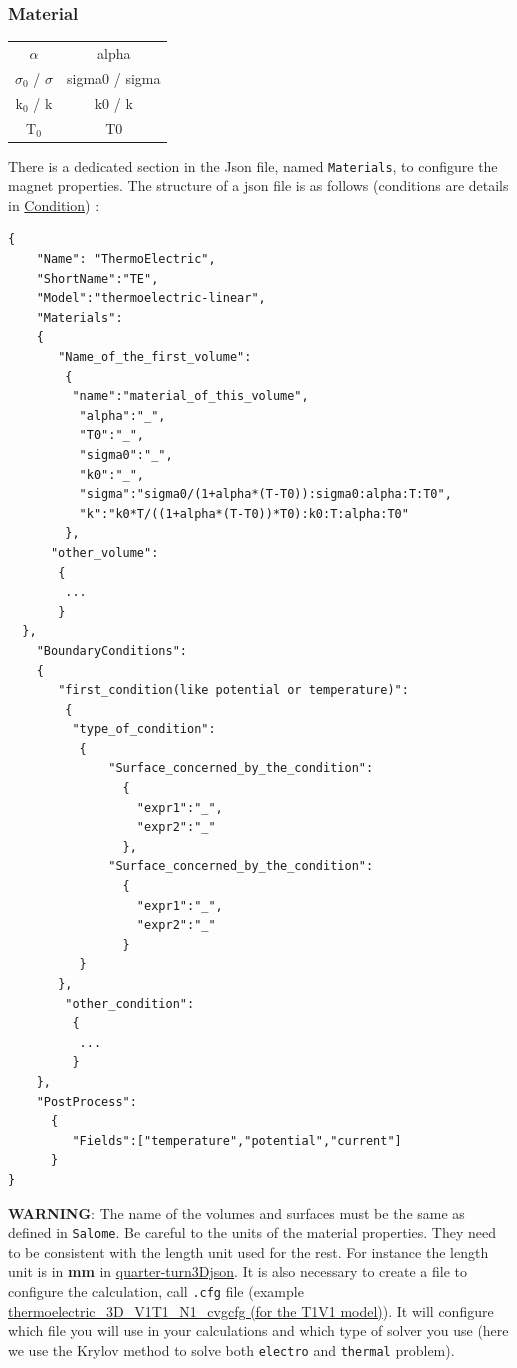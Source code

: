 \documentclass[11pt]{amsart}
\newcommand{\admonition}[2]{\textbf{#1}: {#2}}
\begin{document}
\hypertarget{x-material}{\subsubsection{Material}}
\begin{center}
\begin{tabular}{|c|c|}
\hline
$\alpha$ & alpha \\ 
$\sigma_{0}$ / $\sigma$ & sigma0 / sigma \\ 
k${}_{0}$ / k & k0 / k \\ 
T${}_{0}$ & T0 \\ 
\hline
\end{tabular}
\end{center}

There is a dedicated section in the Json file, named \texttt{Materials}, to configure the magnet properties.
The structure of a json file is as follows (conditions are details in \hyperlink{x-condition}{Condition}) :


\begin{verbatim}
{
    "Name": "ThermoElectric",
    "ShortName":"TE",
    "Model":"thermoelectric-linear",
    "Materials":
    {
	   "Name_of_the_first_volume":
	    {
	     "name":"material_of_this_volume",
	      "alpha":"_",
	      "T0":"_",
	      "sigma0":"_",
	      "k0":"_",
	      "sigma":"sigma0/(1+alpha*(T-T0)):sigma0:alpha:T:T0",
	      "k":"k0*T/((1+alpha*(T-T0))*T0):k0:T:alpha:T0"
	    },
	  "other_volume":
	   {
	    ...
	   }
  },
    "BoundaryConditions":
    {
	   "first_condition(like potential or temperature)":
	    {
	     "type_of_condition":
	      {
		      "Surface_concerned_by_the_condition":
		        {
		          "expr1":"_",
		          "expr2":"_"
		        },
		      "Surface_concerned_by_the_condition":
		        {
		          "expr1":"_",
		          "expr2":"_"
		        }
	      }
	   },
	    "other_condition":
	     {
	      ...
	     }
    },
    "PostProcess":
      {
	     "Fields":["temperature","potential","current"]
      }
}
\end{verbatim}

\admonition{WARNING}{The name of the volumes and surfaces must be the same as defined in \texttt{Salome}.
Be careful to the units of the material properties. They need to be consistent with the length unit used for the rest.
For instance the length unit is in \textbf{mm} in \hyperlink{test.json}{quarter-turn3Djson}.}
It is also necessary to create a file to configure the calculation, call \texttt{.cfg} file (example \hyperlink{example-file.cfg}{thermoelectric_3D_V1T1_N1_cvgcfg (for the T1V1 model)}).
It will configure which file you will use in your calculations and which type of solver you use (here we use the Krylov method to solve both \texttt{electro} and \texttt{thermal} problem).
\end{document}
